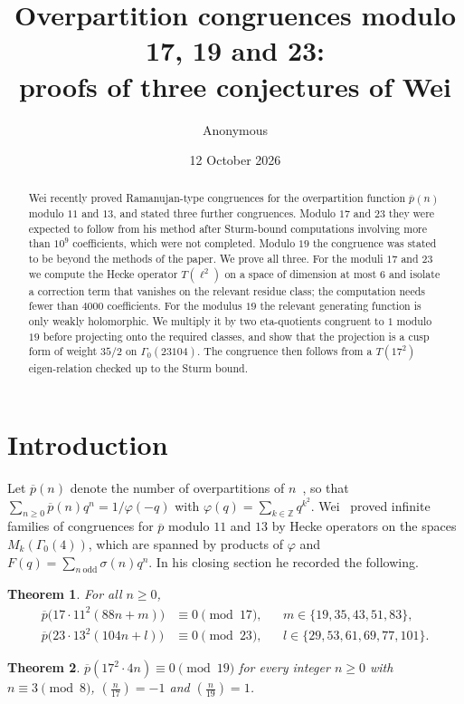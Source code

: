 \documentclass[11pt]{article}
\title{Overpartition congruences modulo 17, 19 and 23:\\ proofs of three conjectures of Wei}
\author{Anonymous}\date{12 October 2026}
\newtheorem{theorem}{Theorem}\newtheorem{lemma}[theorem]{Lemma}\newtheorem{proposition}[theorem]{Proposition}
\theoremstyle{remark}\newtheorem{remark}[theorem]{Remark}
\newcommand{\pb}{\overline{p}}
\newcommand{\leg}[2]{\left(\frac{#1}{#2}\right)}
\begin{document}
\maketitle
\begin{abstract}
Wei recently proved Ramanujan-type congruences for the overpartition function $\pb(n)$ modulo $11$ and $13$, and stated three further congruences. Modulo $17$ and $23$ they were expected to follow from his method after Sturm-bound computations involving more than $10^9$ coefficients, which were not completed. Modulo $19$ the congruence was stated to be beyond the methods of the paper. We prove all three. For the moduli $17$ and $23$ we compute the Hecke operator $T(\ell^2)$ on a space of dimension at most $6$ and isolate a correction term that vanishes on the relevant residue class; the computation needs fewer than $4000$ coefficients. For the modulus $19$ the relevant generating function is only weakly holomorphic. We multiply it by two eta-quotients congruent to $1$ modulo $19$ before projecting onto the required classes, and show that the projection is a cusp form of weight $35/2$ on $\Gamma_0(23104)$. The congruence then follows from a $T(17^2)$ eigen-relation checked up to the Sturm bound.
\end{abstract}

\section{Introduction}
Let $\pb(n)$ denote the number of overpartitions of $n$~\cite{CL}, so that $\sum_{n\ge0}\pb(n)q^n=1/\varphi(-q)$ with $\varphi(q)=\sum_{k\in\mathbb Z}q^{k^2}$. Wei~\cite{Wei} proved infinite families of congruences for $\pb$ modulo $11$ and $13$ by Hecke operators on the spaces $M_k(\Gamma_0(4))$, which are spanned by products of $\varphi$ and $F(q)=\sum_{n\ \mathrm{odd}}\sigma(n)q^n$. In his closing section he recorded the following.

\begin{theorem}\label{thm:1723}
For all $n\ge0$,
\begin{align*}
\pb\bigl(17\cdot11^2(88n+m)\bigr)&\equiv0\pmod{17}, && m\in\{19,35,43,51,83\},\\
\pb\bigl(23\cdot13^2(104n+l)\bigr)&\equiv0\pmod{23}, && l\in\{29,53,61,69,77,101\}.
\end{align*}
\end{theorem}

\begin{theorem}\label{thm:19}
$\pb(17^2\cdot4n)\equiv0\pmod{19}$ for every integer $n\ge0$ with $n\equiv3\pmod 8$, $\leg n{17}=-1$ and $\leg n{19}=1$.
\end{theorem}
\end{document}
